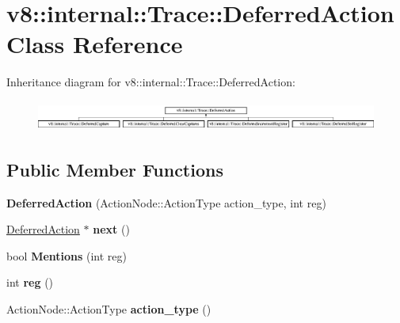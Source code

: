 \hypertarget{classv8_1_1internal_1_1_trace_1_1_deferred_action}{}\section{v8\+:\+:internal\+:\+:Trace\+:\+:Deferred\+Action Class Reference}
\label{classv8_1_1internal_1_1_trace_1_1_deferred_action}
Inheritance diagram for v8\+:\+:internal\+:\+:Trace\+:\+:Deferred\+Action\+:\begin{figure}[H]
\begin{center}
\leavevmode
\includegraphics[height=1.003584cm]{classv8_1_1internal_1_1_trace_1_1_deferred_action}
\end{center}
\end{figure}
\subsection*{Public Member Functions}
\begin{DoxyCompactItemize}
\item 
{\bfseries Deferred\+Action} (Action\+Node\+::\+Action\+Type action\+\_\+type, int reg)\hypertarget{classv8_1_1internal_1_1_trace_1_1_deferred_action_a780db5684ee3c089249f0e3a706ec980}{}\label{classv8_1_1internal_1_1_trace_1_1_deferred_action_a780db5684ee3c089249f0e3a706ec980}

\item 
\hyperlink{classv8_1_1internal_1_1_trace_1_1_deferred_action}{Deferred\+Action} $\ast$ {\bfseries next} ()\hypertarget{classv8_1_1internal_1_1_trace_1_1_deferred_action_acd45c461c5e1ed04f88be43d0c8219bf}{}\label{classv8_1_1internal_1_1_trace_1_1_deferred_action_acd45c461c5e1ed04f88be43d0c8219bf}

\item 
bool {\bfseries Mentions} (int reg)\hypertarget{classv8_1_1internal_1_1_trace_1_1_deferred_action_a21dc8aabaf396310ae95c56477bf55bd}{}\label{classv8_1_1internal_1_1_trace_1_1_deferred_action_a21dc8aabaf396310ae95c56477bf55bd}

\item 
int {\bfseries reg} ()\hypertarget{classv8_1_1internal_1_1_trace_1_1_deferred_action_af1d99354c745bba3171ad4f7f2203246}{}\label{classv8_1_1internal_1_1_trace_1_1_deferred_action_af1d99354c745bba3171ad4f7f2203246}

\item 
Action\+Node\+::\+Action\+Type {\bfseries action\+\_\+type} ()\hypertarget{classv8_1_1internal_1_1_trace_1_1_deferred_action_a7b2e8c58b919f2462e71c1e592a37582}{}\label{classv8_1_1internal_1_1_trace_1_1_deferred_action_a7b2e8c58b919f2462e71c1e592a37582}

\end{DoxyCompactItemize}
